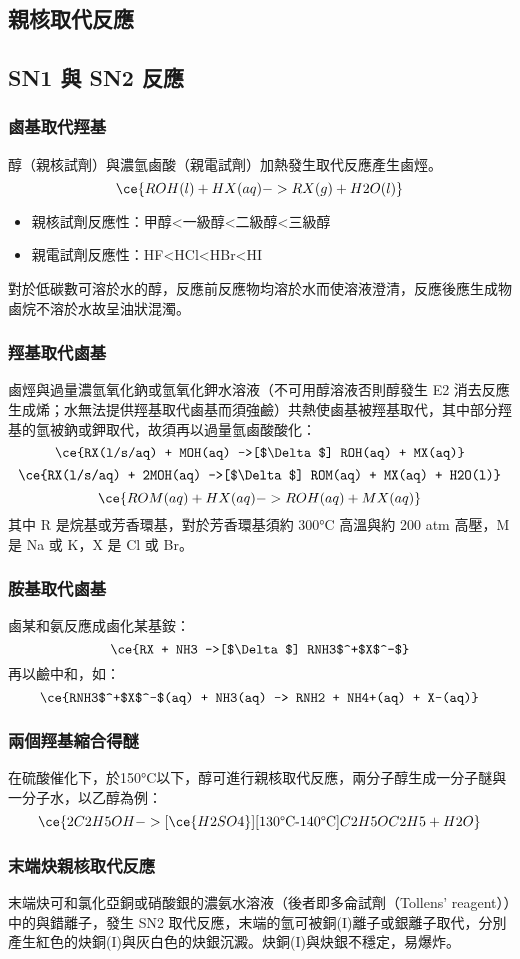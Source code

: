 \documentclass[a4paper,12pt]{report}
\begin{document}
\begin{itemize}
\section{親核取代反應}
\subsection{SN1 與 SN2 反應}
\subsubsection{鹵基取代羥基}
醇（親核試劑）與濃氫鹵酸（親電試劑）加熱發生取代反應產生鹵烴。
\[\ce{ROH(l) + HX(aq) -> RX(g) + H2O(l)}\]
\begin{itemize}
\item 親核試劑反應性：甲醇<一級醇<二級醇<三級醇
\item 親電試劑反應性：HF<HCl<HBr<HI
\end{itemize}
對於低碳數可溶於水的醇，反應前反應物均溶於水而使溶液澄清，反應後應生成物鹵烷不溶於水故呈油狀混濁。
\subsubsection{羥基取代鹵基}
鹵烴與過量濃氫氧化鈉或氫氧化鉀水溶液（不可用醇溶液否則醇發生 E2 消去反應生成烯；水無法提供羥基取代鹵基而須強鹼）共熱使鹵基被羥基取代，其中部分羥基的氫被鈉或鉀取代，故須再以過量氫鹵酸酸化：
\[\ce{RX(l/s/aq) + MOH(aq) ->[$\Delta$] ROH(aq) + MX(aq)}\]
\[\ce{RX(l/s/aq) + 2MOH(aq) ->[$\Delta$] ROM(aq) + MX(aq) + H2O(l)}\]
\[\ce{ROM(aq) + HX(aq) -> ROH(aq) + MX(aq)}\]
其中 R 是烷基或芳香環基，對於芳香環基須約 300°C 高溫與約 200 atm 高壓，M 是 Na 或 K，X 是 Cl 或 Br。
\subsubsection{胺基取代鹵基}
鹵某和氨反應成鹵化某基銨：
\[\ce{RX + NH3 ->[$\Delta$] RNH3$^+$X$^-$}\]
再以鹼中和，如：
\[\ce{RNH3$^+$X$^-$(aq) + NH3(aq) -> RNH2 + NH4+(aq) + X-(aq)}\]
\subsubsection{兩個羥基縮合得醚}
在硫酸催化下，於150°C以下，醇可進行親核取代反應，兩分子醇生成一分子醚與一分子水，以乙醇為例：
\[\ce{2C2H5OH ->[\ce{H2SO4}][\text{130°C-140°C}] C2H5OC2H5 + H2O}\]
\subsubsection{末端炔親核取代反應}
末端炔可和氯化亞銅或硝酸銀的濃氨水溶液（後者即多侖試劑（Tollens' reagent））中的\ce{[Cu(NH3)2]^+}與\ce{[Ag(NH3)2]^+}錯離子，發生 SN2 取代反應，末端的氫可被銅(I)離子或銀離子取代，分別產生紅色的炔銅(I)與灰白色的炔銀沉澱。炔銅(I)與炔銀不穩定，易爆炸。

\end{itemize}
\end{document}
